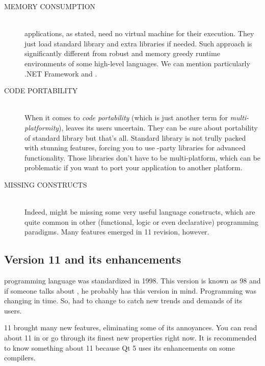 \begin{description}
\vfill

\item[MEMORY CONSUMPTION\ts{\textcolor{ultragreen}{good}}]\hfill \\
\cpp{} applications, as stated, need no virtual machine for their execution. They just load standard \cpp{} library and extra libraries if needed. Such approach is significantly different from robust and memory greedy runtime environments of some high-level languages. We can mention particularly .NET Framework and .

\item[CODE PORTABILITY\ts{\textcolor{red}{bad}}]\hfill \\
When it comes to \textit{code portability} (which is just another term for \textit{multi-platformity}), \cpp{} leaves its users uncertain. They can be sure about portability of \cpp{} standard library but that's all. Standard library is not trully packed with stunning features, forcing you to use -party libraries for advanced functionality. Those libraries don't have to be multi-platform, which can be problematic if you want to port your application to another platform.

\item[MISSING CONSTRUCTS\ts{\textcolor{red}{bad}}]\hfill \\
Indeed, \cpp{} might be missing some very useful language constructs, which are quite common in other (\eg functional, logic or even declarative) programming paradigms. Many features emerged in \cpp{} 11 revision, however.
\end{description}

\vfill

\subsection{Version 11 and its enhancements}
\cpp{} programming language was standardized in 1998. This version is known as \cpp{} 98 and if someone talks about \cpp, he probably has this version in mind. Programming was changing in time. So, \cpp{} had to change to catch new trends and demands of its users.

\cpp{} 11 brought many new features, eliminating some of its annoyances. You can read about \cpp{} 11 in \citep{various:cppstandard} or go through its finest new properties right now. It is recommended to know something about \cpp{} 11 because Qt 5 uses its enhancements on some compilers.

